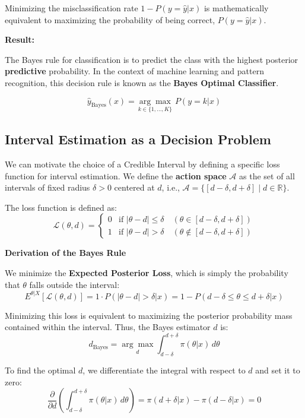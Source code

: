 \documentclass[
  letterpaper,
  DIV=11,
  numbers=noendperiod]{scrreprt}
\renewcommand{\[}{\begin{equation}}
\renewcommand{\]}{\end{equation}}
\theoremstyle{definition}
\theoremstyle{plain}
\theoremstyle{plain}
\theoremstyle{plain}
\theoremstyle{definition}
\theoremstyle{plain}
\theoremstyle{remark}
\begin{document}
Minimizing the misclassification rate \(1 - P(y = \hat{y} | x)\) is
mathematically equivalent to maximizing the probability of being
correct, \(P(y = \hat{y} | x)\).

\textbf{Result:}

The Bayes rule for classification is to predict the class with the
highest posterior \textbf{predictive} probability. In the context of
machine learning and pattern recognition, this decision rule is known as
the \textbf{Bayes Optimal Classifier}.

\[
\hat{y}_{\text{Bayes}}(x) = \underset{k \in \{1, \dots, K\}}{\arg\max} \ P(y = k | x)
\]

\subsection{Interval Estimation as a Decision
Problem}\label{interval-estimation-as-a-decision-problem}

We can motivate the choice of a Credible Interval by defining a specific
loss function for interval estimation. We define the \textbf{action
space} \(\mathcal{A}\) as the set of all intervals of fixed radius
\(\delta > 0\) centered at \(d\), i.e.,
\(\mathcal{A} = \{ [d - \delta, d + \delta] \mid d \in \mathbb{R} \}\).

The loss function is defined as: \[
\mathcal{L}(\theta, d) = \begin{cases} 
0 & \text{if } |\theta - d| \le \delta \quad (\theta \in [d-\delta, d+\delta]) \\
1 & \text{if } |\theta - d| > \delta \quad (\theta \notin [d-\delta, d+\delta])
\end{cases}
\]

\textbf{Derivation of the Bayes Rule}

We minimize the \textbf{Expected Posterior Loss}, which is simply the
probability that \(\theta\) falls outside the interval: \[
E^{\theta|X}[\mathcal{L}(\theta, d)] = 1 \cdot P(|\theta - d| > \delta | x) = 1 - P(d - \delta \le \theta \le d + \delta | x)
\]

Minimizing this loss is equivalent to maximizing the posterior
probability mass contained within the interval. Thus, the Bayes
estimator \(d\) is: \[
d_{\text{Bayes}} = \underset{d}{\arg\max} \int_{d-\delta}^{d+\delta} \pi(\theta|x) \, d\theta
\]

To find the optimal \(d\), we differentiate the integral with respect to
\(d\) and set it to zero: \[
\frac{\partial}{\partial d} \left( \int_{d-\delta}^{d+\delta} \pi(\theta|x) \, d\theta \right) = \pi(d+\delta|x) - \pi(d-\delta|x) = 0
\]
\end{document}
